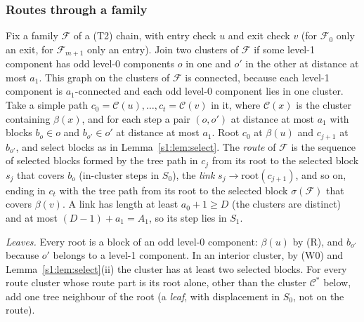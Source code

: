 \documentclass[11pt]{amsart}
\theoremstyle{definition}
\theoremstyle{remark}
\numberwithin{equation}{section}
\newcommand{\cF}{\mathcal{F}}
\begin{document}
\subsubsection{Routes through a family}\label{s1:sec:routes}
Fix a family $\cF$ of a (T2) chain, with entry check $u$ and exit check $v$ (for $\cF_0$ only an exit, for $\cF_{m+1}$ only an entry). Join two clusters of $\cF$ if some level-1 component has odd level-0 components $o$ in one and $o'$ in the other at distance at most $a_1$. This graph on the clusters of $\cF$ is connected, because each level-1 component is $a_1$-connected and each odd level-0 component lies in one cluster. Take a simple path $c_0=\mathcal C(u),\dots,c_t=\mathcal C(v)$ in it, where $\mathcal C(x)$ is the cluster containing $\beta(x)$, and for each step a pair $(o,o')$ at distance at most $a_1$ with blocks $b_o\in o$ and $b_{o'}\in o'$ at distance at most $a_1$. Root $c_0$ at $\beta(u)$ and $c_{j+1}$ at $b_{o'}$, and select blocks as in Lemma~\ref{s1:lem:select}. The \emph{route} of $\cF$ is the sequence of selected blocks formed by the tree path in $c_j$ from its root to the selected block $s_j$ that covers $b_o$ (in-cluster steps in $S_0$), the \emph{link} $s_j\to\mathrm{root}(c_{j+1})$, and so on, ending in $c_t$ with the tree path from its root to the selected block $\sigma(\cF)$ that covers $\beta(v)$. A link has length at least $a_0+1\ge D$ (the clusters are distinct) and at most $(D-1)+a_1=A_1$, so its step lies in $S_1$.

\emph{Leaves.} Every root is a block of an odd level-0 component: $\beta(u)$ by (R), and $b_{o'}$ because $o'$ belongs to a level-1 component. In an interior cluster, by (W0) and Lemma~\ref{s1:lem:select}(ii) the cluster has at least two selected blocks. For every route cluster whose route part is its root alone, other than the cluster $\mathcal C^*$ below, add one tree neighbour of the root (a \emph{leaf}, with displacement in $S_0$, not on the route).
\end{document}
